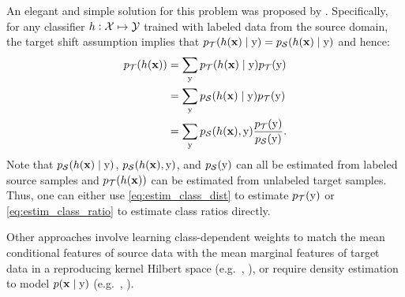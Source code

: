 An elegant and simple solution for this problem was proposed by \citet{Lipton2018}. Specifically, for any classifier $h: {\mathcal{X}} \mapsto {\mathcal{Y}}$ trained with labeled data from the source domain, the target shift assumption implies that $p_{{\mathcal{T}}}(h({\mathbf{x}}) \mid {\textnormal{y}}) = p_{{\mathcal{S}}}(h({\mathbf{x}}) \mid {\textnormal{y}})$ and hence:
\begin{align}
p_{\gT}(h(\rvx)) &= \sum_{\ry} p_{\gT}(h(\rvx) \mid \ry) p_{\gT}(\ry) \nonumber\\
\allowdisplaybreaks
&= \sum_{\ry} p_{\gS}(h(\rvx) \mid \ry) p_{\gT}(\ry) \label{eq:estim_class_dist}\\
\allowdisplaybreaks
&= \sum_{\ry} p_{\gS}(h(\rvx), \ry) \frac{p_{\gT}(\ry)}{p_{\gS}(\ry)}. \label{eq:estim_class_ratio}
\end{align}
Note that $p_{{\mathcal{S}}}(h({\mathbf{x}}) \mid {\textnormal{y}})$, $p_{{\mathcal{S}}}(h({\mathbf{x}}), {\textnormal{y}})$, and $p_{{\mathcal{S}}}({\textnormal{y}})$ can all be estimated from labeled source samples and $p_{{\mathcal{T}}}(h({\mathbf{x}}))$ can be estimated from unlabeled target samples. Thus, one can either use \eqref{eq:estim_class_dist} to estimate $p_{{\mathcal{T}}}({\textnormal{y}})$ or \eqref{eq:estim_class_ratio} to estimate class ratios directly.

Other approaches involve learning class-dependent weights to match the mean conditional features of source data with the mean marginal features of target data in a reproducing kernel Hilbert space (e.g.\  \citet{Iyer2004}, \citet{Zhang2013}), or require density estimation to model $p({\mathbf{x}} \mid {\textnormal{y}})$ (e.g.\ \citet{Chan2005}, \citet{Storkey2009}).

